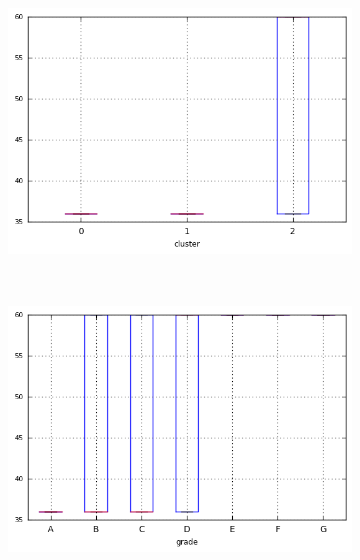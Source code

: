 \begin{anexosenv}
\begin{figure}[t!]
\begin{subfigure}[t]{0.45\textwidth}
            \centerline{\includegraphics[width=1\textwidth]{img/term_float_by_cluster}}
        \end{subfigure}%
        ~ 
        \begin{subfigure}[t]{0.45\textwidth}
            \centering
   
            \centerline{\includegraphics[width=1\textwidth]{img/term_float_by_grade}}

        \end{subfigure}
        \\
                \caption{\emph{Boxplots} de loan\textunderscore amnt}
        \begin{subfigure}[t]{0.45\textwidth}
            \centering


\end{subfigure}
\end{figure}
\end{anexosenv}
